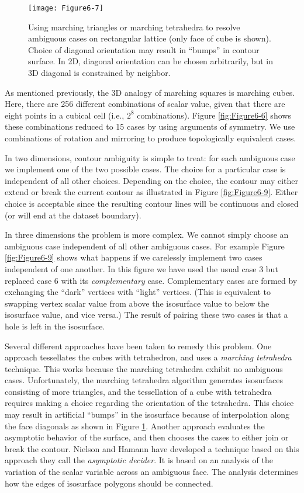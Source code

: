 \begin{figure}[!htb]
	\centering
	\texttt{[image: Figure6-7]}\\
	\caption{Using marching triangles or marching tetrahedra to resolve ambiguous cases on rectangular lattice (only face of cube is shown). Choice of diagonal orientation may result in ``bumps'' in contour surface. In 2D, diagonal orientation can be chosen arbitrarily, but in 3D diagonal is constrained by neighbor.}
	\label{fig:Figure6-7}
\end{figure}

As mentioned previously, the 3D analogy of marching squares is marching cubes. Here, there are 256 different combinations of scalar value, given that there are eight points in a cubical cell (i.e., $2^8$ combinations). Figure \ref{fig:Figure6-6} shows these combinations reduced to 15 cases by using arguments of symmetry. We use combinations of rotation and mirroring to produce topologically equivalent cases.

In two dimensions, contour ambiguity is simple to treat: for each ambiguous case we implement one of the two possible cases. The choice for a particular case is independent of all other choices. Depending on the choice, the contour may either extend or break the current contour as illustrated in Figure \ref{fig:Figure6-9}. Either choice is acceptable since the resulting contour lines will be continuous and closed (or will end at the dataset boundary).

In three dimensions the problem is more complex. We cannot simply choose an ambiguous case independent of all other ambiguous cases. For example Figure \ref{fig:Figure6-9} shows what happens if we carelessly implement two cases independent of one another. In this figure we have used the usual case 3 but replaced case 6 with its \emph{complementary} case. Complementary cases are formed by exchanging the ``dark'' vertices with ``light'' vertices. (This is equivalent to swapping vertex scalar value from above the isosurface value to below the isosurface value, and vice versa.) The result of pairing these two cases is that a hole is left in the isosurface.

Several different approaches have been taken to remedy this problem. One approach tessellates the cubes with tetrahedron, and uses a \emph{marching tetrahedra} technique. This works because the marching tetrahedra exhibit no ambiguous cases. Unfortunately, the marching tetrahedra algorithm generates isosurfaces consisting of more triangles, and the tessellation of a cube with tetrahedra requires making a choice regarding the orientation of the tetrahedra. This choice may result in artificial ``bumps'' in the isosurface because of interpolation along the face diagonals as shown in Figure \ref{fig:Figure6-7}. Another approach evaluates the asymptotic behavior of the surface, and then chooses the cases to either join or break the contour. Nielson and Hamann \cite{Nielson91} have developed a technique based on this approach they call the \emph{asymptotic decider}. It is based on an analysis of the variation of the scalar variable across an ambiguous face. The analysis determines how the edges of isosurface polygons should be connected.

